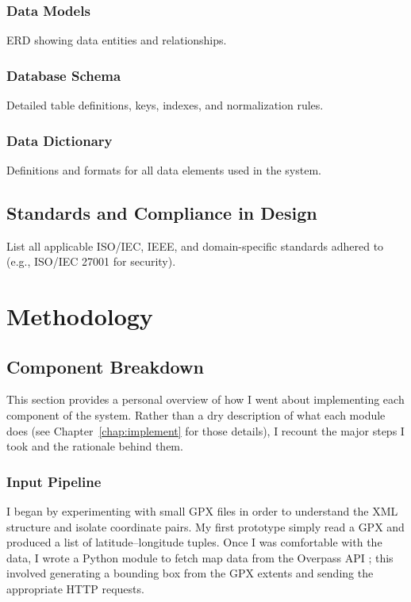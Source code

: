 \documentclass[11pt,twoside]{report}
\begin{document}
\subsection{Data Models}
ERD showing data entities and relationships.

\subsection{Database Schema}
Detailed table definitions, keys, indexes, and normalization rules.

\subsection{Data Dictionary}
Definitions and formats for all data elements used in the system.


\section{Standards and Compliance in Design}
List all applicable ISO/IEC, IEEE, and domain-specific standards adhered to (e.g., ISO/IEC 27001 \citep{ISO27001} for security).

\chapter{Methodology}
\label{chap:methodology}

\section{Component Breakdown}
This section provides a personal overview of how I went about implementing each component of the system. Rather than a dry description of what each module does (see Chapter~\ref{chap:implement} for those details), I recount the major steps I took and the rationale behind them.
\subsection{Input Pipeline}
I began by experimenting with small GPX files in order to understand the XML structure and isolate coordinate pairs. My first prototype simply read a GPX and produced a list of latitude--longitude tuples. Once I was comfortable with the data, I wrote a Python module to fetch map data from the Overpass API \citep{OverpassAPI}; this involved generating a bounding box from the GPX extents and sending the appropriate HTTP requests.
\end{document}
